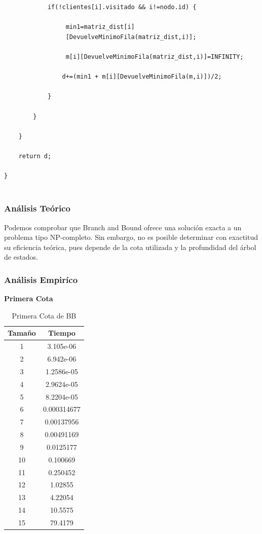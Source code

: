 \documentclass[a4paper,12pt,twoside]{article} %
\begin{document}
\begin{lstlisting}
            if(!clientes[i].visitado && i!=nodo.id) {

                 min1=matriz_dist[i]
                 [DevuelveMinimoFila(matriz_dist,i)];

                 m[i][DevuelveMinimoFila(matriz_dist,i)]=INFINITY;

                d+=(min1 + m[i][DevuelveMinimoFila(m,i)])/2;

            }

        }

    }

    return d;

}


\end{lstlisting}

\newpage

\subsubsection{Análisis Teórico}
Podemos comprobar que Branch and Bound ofrece una solución exacta a un problema tipo NP-completo. Sin embargo, no es posible determinar con exactitud su eficiencia teórica, pues depende de la cota utilizada y la profundidad del árbol de estados.\\
\newpage

\subsubsection{Análisis Empiríco}
\vspace{0.5cm}

\textbf{Primera Cota}

\begin{table}[h]
    \begin{center}
	\begin{tabular}{|c|c|}
		\hline
		Tamaño & Tiempo \\
		\hline
            1 & 3.105e-06 \\
            2 & 6.942e-06 \\
            3 & 1.2586e-05 \\
            4 & 2.9624e-05 \\
            5 & 8.2204e-05 \\
            6 & 0.000314677 \\
            7 & 0.00137956 \\
            8 & 0.00491169 \\
            9 & 0.0125177 \\
            10 & 0.100669 \\
            11 & 0.250452 \\
            12 & 1.02855 \\
            13 & 4.22054 \\
            14 & 10.5575 \\
            15 & 79.4179 \\	
		\hline
	\end{tabular}
    \end{center}
    \caption{Primera Cota de BB}
\end{table}
\newpage
\end{document}
